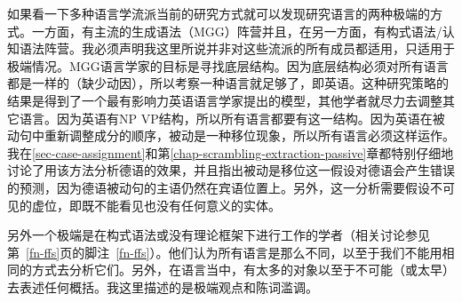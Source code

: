 如果看一下多种语言学流派当前的研究方式就可以发现研究语言的两种极端的方式。一方面，有主流的生成语法（MGG）阵营并且，在另一方面，有构式语法/认知语法阵营。我必须声明我这里所说并非对这些流派的所有成员都适用，只适用于极端情况。MGG语言学家的目标是寻找底层结构。因为底层结构必须对所有语言都是一样的（缺少动因），所以考察一种语言就足够了，即英语。这种研究策略的结果是得到了一个最有影响力英语语言学家提出的模型，其他学者就尽力去调整其它语言。因为英语有NP VP结构，所以所有语言都要有这一结构。因为英语在被动句中重新调整成分的顺序，被动是一种移位现象，所以所有语言必须这样运作。我在\ref{sec-case-assignment}和第\ref{chap-scrambling-extraction-passive}章都特别仔细地讨论了用该方法分析德语的效果，并且指出被动是移位这一假设对德语会产生错误的预测，因为德语被动句的主语仍然在宾语位置上。另外，这一分析需要假设不可见的虚位，即既不能看见也没有任何意义的实体。

另外一个极端是在构式语法或没有理论框架下进行工作的学者（相关讨论参见第~\ref{fn-ffs}页的脚注~\ref{fn-ffs}）。他们认为所有语言是那么不同，以至于我们不能用相同的方式去分析它们。另外，在语言当中，有太多的对象以至于不可能（或太早）去表述任何概括。我这里描述的是极端观点和陈词滥调。

